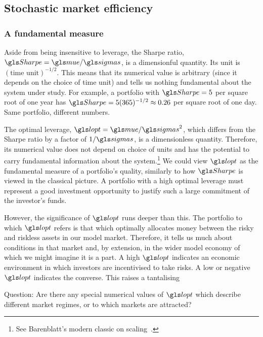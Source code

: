 \subsection{Stochastic market efficiency}

\subsubsection{A fundamental measure}
Aside from being insensitive to leverage, the Sharpe ratio, $\Sharpe=\mue/\sigmas$, is a dimensionful quantity. Its unit is $(\text{time unit})^{-1/2}$. This means that its numerical value is arbitrary (since it depends on the choice of time unit) and tells us nothing fundamental about the system under study. For example, a portfolio with $\Sharpe=5$ per square root of one year has $\Sharpe=5(365)^{-1/2}\approx0.26$ per square root of one day. Same portfolio, different numbers.

The optimal leverage, $\lopt=\mue/\sigmas^2$, which differs from the Sharpe ratio by a factor of $1/\sigmas$, is a dimensionless quantity. Therefore, its numerical value does not depend on choice of units and has the potential to carry fundamental information about the system.\footnote{See Barenblatt's modern classic on scaling~\cite{Barenblatt2003}.} We could view $\lopt$ as the fundamental measure of a portfolio's quality, similarly to how $\Sharpe$ is viewed in the classical picture. A portfolio with a high optimal leverage must represent a good investment opportunity to justify such a large commitment of the investor's funds.

However, the significance of $\lopt$ runs deeper than this. The portfolio to which $\lopt$ refers is that which optimally allocates money between the risky and riskless assets in our model market. Therefore, it tells us much about conditions in that market and, by extension, in the wider model economy of which we might imagine it is a part. A high $\lopt$ indicates an economic environment in which investors are incentivised to take risks. A low or negative $\lopt$ indicates the converse. This raises a tantalising
\begin{keypts}{Question:}
Are there any special numerical values of $\lopt$ which describe different market regimes, or to which markets are attracted?
\end{keypts}

